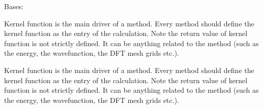 \documentclass[letterpaper,10pt,english]{sphinxmanual}
\begin{document}
\begin{fulllineitems}
\label{\detokenize{fcdft.hessian:fcdft.hessian.numhess.Hessian}}
\pysigstartsignatures
\pysiglinewithargsret
{}
{}
{}
\pysigstopsignatures
\sphinxAtStartPar
Bases: 

\begin{fulllineitems}
\label{\detokenize{fcdft.hessian:fcdft.hessian.numhess.Hessian.hess}}
\pysigstartsignatures
\pysiglinewithargsret
{}
{\sphinxparamcomma {}\sphinxparamcomma {}\sphinxparamcomma {}\sphinxparamcomma {}\sphinxparamcomma {}}
{}
\pysigstopsignatures
\sphinxAtStartPar
Kernel function is the main driver of a method.  Every method should
define the kernel function as the entry of the calculation.  Note the
return value of kernel function is not strictly defined.  It can be
anything related to the method (such as the energy, the wave\sphinxhyphen{}function,
the DFT mesh grids etc.).

\end{fulllineitems}


\begin{fulllineitems}
\label{\detokenize{fcdft.hessian:fcdft.hessian.numhess.Hessian.kernel}}
\pysigstartsignatures
\pysiglinewithargsret
{}
{\sphinxparamcomma {}\sphinxparamcomma {}\sphinxparamcomma {}\sphinxparamcomma {}\sphinxparamcomma {}}
{}
\pysigstopsignatures
\sphinxAtStartPar
Kernel function is the main driver of a method.  Every method should
define the kernel function as the entry of the calculation.  Note the
return value of kernel function is not strictly defined.  It can be
anything related to the method (such as the energy, the wave\sphinxhyphen{}function,
the DFT mesh grids etc.).


\end{fulllineitems}
\end{fulllineitems}
\end{document}
